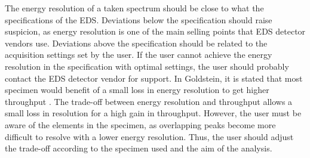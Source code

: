 

The energy resolution of a taken spectrum should be close to what the specifications of the EDS.
Deviations below the specification should raise suspicion, as energy resolution is one of the main selling points that EDS detector vendors use.
Deviations above the specification should be related to the acquisition settings set by the user.
If the user cannot achieve the energy resolution in the specification with optimal settings, the user should probably contact the EDS detector vendor for support.
In Goldstein, it is stated that most specimen would benefit of a small loss in energy resolution to get higher throughput \cite[16.3.2]{goldstein_scanning_2018}.
The trade-off between energy resolution and throughput allows a small loss in resolution for a high gain in throughput.
However, the user must be aware of the elements in the specimen, as overlapping peaks become more difficult to resolve with a lower energy resolution.
Thus, the user should adjust the trade-off according to the specimen used and the aim of the analysis.










